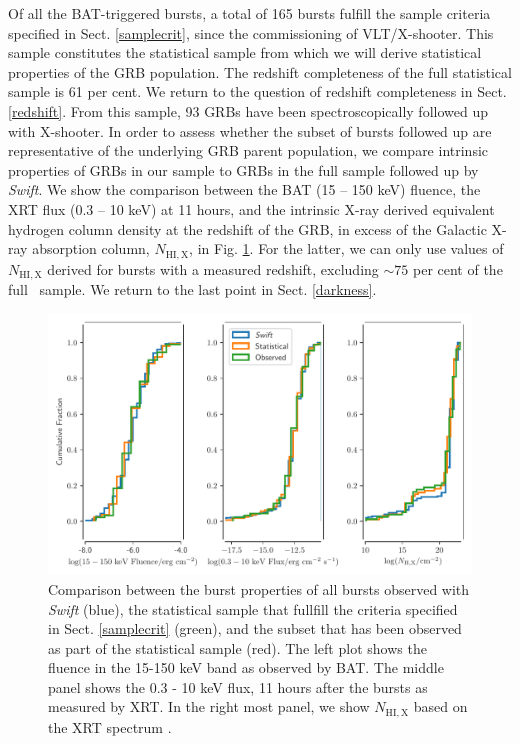\documentclass[longauth]{aa}    %
\begin{document}
Of all the BAT-triggered bursts, a total of 165 bursts fulfill the sample
criteria specified in Sect. \ref{samplecrit}, since the commissioning of
VLT/X-shooter. This sample constitutes the statistical sample from
which we will derive statistical properties of the GRB population. The redshift
completeness of the full statistical sample is 61 per cent. We return to the
question of redshift completeness in Sect. \ref{redshift}. From this sample, 93
GRBs have been spectroscopically followed up with X-shooter. In order to assess
whether the subset of bursts followed up are representative of the underlying
GRB parent population, we compare intrinsic properties of GRBs in our sample to
GRBs in the full sample followed up by \textit{Swift}. We show the comparison
between the BAT (15 -- 150 keV) fluence, the XRT flux (0.3 -- 10 keV) at 11
hours, and the intrinsic X-ray derived equivalent hydrogen column density at the
redshift of the GRB, in excess of the Galactic X-ray absorption column,
$N_{\mathrm{HI,X}}$, in Fig. \ref{fig:swift_complete}. For the latter, we can
only use values of $N_{\mathrm{HI,X}}$ derived for bursts with a measured
redshift, excluding $\sim 75$ per cent of the full \swift~sample. We return to
the last point in Sect. \ref{darkness}.


\begin{figure}
	\centerline{\includegraphics[width=\linewidth]{figures/completeness_BAT.pdf}}
\caption{Comparison between the burst properties of all bursts observed with
	\textit{Swift} (blue), the statistical sample that fullfill the criteria
	specified in Sect. \ref{samplecrit} (green), and the subset that has been
	observed as part of the statistical sample (red). The left plot shows the
	fluence in the 15-150 keV band as observed by BAT. The middle panel shows the 0.3 - 10
	keV flux, 11 hours after the bursts as measured by XRT. In the right most
	panel, we show $N_{\mathrm{HI,X}}$ based on the XRT spectrum
	\citep{Evans2009}.} \label{fig:swift_complete}
\end{figure}
\end{document}
